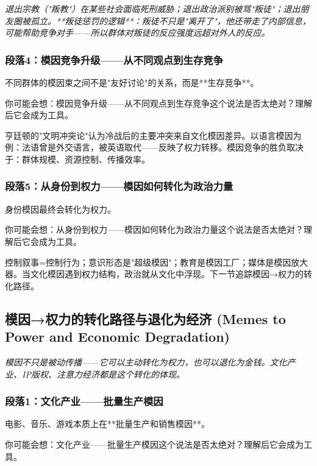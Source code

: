 \documentclass[a4paper,12pt]{book}
\newenvironment{motivation}{\begin{tcolorbox}[colback=gray!10,colframe=gray!60,title=\textit{动机}]\small\itshape}{\end{tcolorbox}}
\begin{document}
\begin{motivation}
\begin{motivation}
\begin{motivation}
退出宗教（"叛教"）在某些社会面临死刑威胁；退出政治派别被骂"叛徒"；退出朋友圈被孤立。**叛徒惩罚的逻辑**：叛徒不只是"离开了"，他还带走了内部信息，可能帮助竞争对手——所以群体对叛徒的反应强度远超对外人的反应。

	\subsubsection*{段落4：模因竞争升级——从不同观点到生存竞争}
	不同群体的模因束之间不是"友好讨论"的关系，而是**生存竞争**。
	\begin{tcolorbox}[colback=yellow!5, title=\textit{读者行为预测}]
		你可能会想：模因竞争升级——从不同观点到生存竞争这个说法是否太绝对？理解后它会成为工具。
	\end{tcolorbox}

亨廷顿的"文明冲突论"认为冷战后的主要冲突来自文化模因差异。以语言模因为例：法语曾是外交语言，被英语取代——反映了权力转移。模因竞争的胜负取决于：群体规模、资源控制、传播效率。

	\subsubsection*{段落5：从身份到权力——模因如何转化为政治力量}
	身份模因最终会转化为权力。
	\begin{tcolorbox}[colback=yellow!5, title=\textit{读者行为预测}]
		你可能会想：从身份到权力——模因如何转化为政治力量这个说法是否太绝对？理解后它会成为工具。
	\end{tcolorbox}

控制叙事=控制行为；意识形态是"超级模因"；教育是模因工厂；媒体是模因放大器。当文化模因遇到权力结构，政治就从文化中浮现。下一节追踪模因→权力的转化路径。

	\subsection{模因→权力的转化路径与退化为经济 (Memes to Power and Economic Degradation)}
	\begin{motivation}
		模因不只是被动传播——它可以主动转化为权力，也可以退化为金钱。文化产业、IP版权、注意力经济都是这个转化的体现。
	\end{motivation}

	\subsubsection*{段落1：文化产业——批量生产模因}
	电影、音乐、游戏本质上在**批量生产和销售模因**。
	\begin{tcolorbox}[colback=yellow!5, title=\textit{读者行为预测}]
		你可能会想：文化产业——批量生产模因这个说法是否太绝对？理解后它会成为工具。
	\end{tcolorbox}


\end{motivation}
\end{motivation}
\end{motivation}
\end{document}
